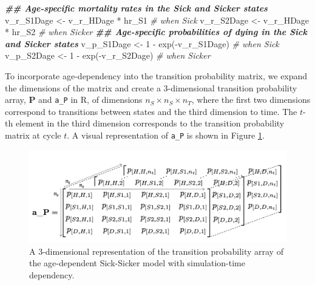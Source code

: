 \documentclass[
]{article}
\newenvironment{Shaded}{\begin{snugshade}}{\end{snugshade}}
\newcommand{\CommentTok}[1]{\textcolor[rgb]{0.56,0.35,0.01}{\textit{#1}}}
\newcommand{\DecValTok}[1]{\textcolor[rgb]{0.00,0.00,0.81}{#1}}
\newcommand{\DocumentationTok}[1]{\textcolor[rgb]{0.56,0.35,0.01}{\textbf{\textit{#1}}}}
\newcommand{\FunctionTok}[1]{\textcolor[rgb]{0.00,0.00,0.00}{#1}}
\newcommand{\NormalTok}[1]{#1}
\newcommand{\OtherTok}[1]{\textcolor[rgb]{0.56,0.35,0.01}{#1}}
\newcommand{\SpecialCharTok}[1]{\textcolor[rgb]{0.00,0.00,0.00}{#1}}
\begin{document}
\begin{Shaded}
\begin{Highlighting}[]
\DocumentationTok{\#\# Age{-}specific mortality rates in the Sick and Sicker states}
\NormalTok{v\_r\_S1Dage }\OtherTok{\textless{}{-}}\NormalTok{ v\_r\_HDage }\SpecialCharTok{*}\NormalTok{ hr\_S1 }\CommentTok{\# when Sick}
\NormalTok{v\_r\_S2Dage }\OtherTok{\textless{}{-}}\NormalTok{ v\_r\_HDage }\SpecialCharTok{*}\NormalTok{ hr\_S2 }\CommentTok{\# when Sicker}
\DocumentationTok{\#\# Age{-}specific probabilities of dying in the Sick and Sicker states}
\NormalTok{v\_p\_S1Dage }\OtherTok{\textless{}{-}} \DecValTok{1} \SpecialCharTok{{-}} \FunctionTok{exp}\NormalTok{(}\SpecialCharTok{{-}}\NormalTok{v\_r\_S1Dage) }\CommentTok{\# when Sick}
\NormalTok{v\_p\_S2Dage }\OtherTok{\textless{}{-}} \DecValTok{1} \SpecialCharTok{{-}} \FunctionTok{exp}\NormalTok{(}\SpecialCharTok{{-}}\NormalTok{v\_r\_S2Dage) }\CommentTok{\# when Sicker}
\end{Highlighting}
\end{Shaded}

To incorporate age-dependency into the transition probability matrix, we expand the dimensions of the matrix and create a 3-dimensional transition probability array, \(\mathbf{P}\) and \texttt{a\_P} in R, of dimensions \(n_S \times n_S \times n_T\), where the first two dimensions correspond to transitions between states and the third dimension to time. The \(t\)-th element in the third dimension corresponds to the transition probability matrix at cycle \(t\). A visual representation of \texttt{a\_P} is shown in Figure \ref{fig:Array-Time-Dependent}.

\begin{figure}[H]

{\centering \includegraphics[width=1\linewidth]{figs/3D-state-transition-array-sick-sicker-without-tunnels} 

}

\caption{A 3-dimensional representation of the transition probability array of the age-dependent Sick-Sicker model with simulation-time dependency.}\label{fig:Array-Time-Dependent}
\end{figure}
\end{document}
